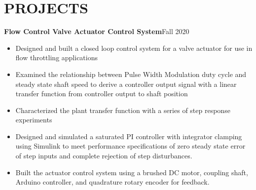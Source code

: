 \documentclass{article}
\begin{document}
\section{PROJECTS}
\vspace{0.5em}
\textbf{Flow Control Valve Actuator Control System}\hfill Fall 2020
\vspace{0.5em}
\begin{itemize}
	\item Designed and built a closed loop control system for a valve actuator for use in flow throttling applications
	\item Examined the relationship between Pulse Width Modulation duty cycle and steady state shaft speed to derive a controller output signal with a linear transfer function from controller output to shaft position  
	\item Characterized the plant transfer function with a series of step response experiments
	\item  Designed and simulated a saturated PI controller with integrator clamping using Simulink to meet performance specifications of zero steady state error of step inputs and complete rejection of step disturbances.
	\item  Built the actuator control system using a brushed DC motor, coupling shaft, Arduino controller, and quadrature rotary encoder for feedback.
\end{itemize}
\thispagestyle{empty}
\end{document}
